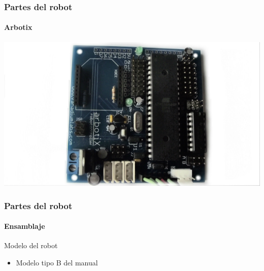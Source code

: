 \documentclass{beamer}
\begin{document}
\begin{frame}
\frametitle{Partes del robot}
 \framesubtitle{Arbotix}
\centering
\includegraphics[scale=0.12]{Arbotix.jpg} 

\end{frame}

\begin{frame}
\frametitle{Partes del robot}
\framesubtitle{Ensamblaje}

\begin{block}{Modelo del robot}
	\begin{itemize}
		\item Modelo tipo B del manual	
	\end{itemize}
\end{block}

\end{frame}
\end{document}
